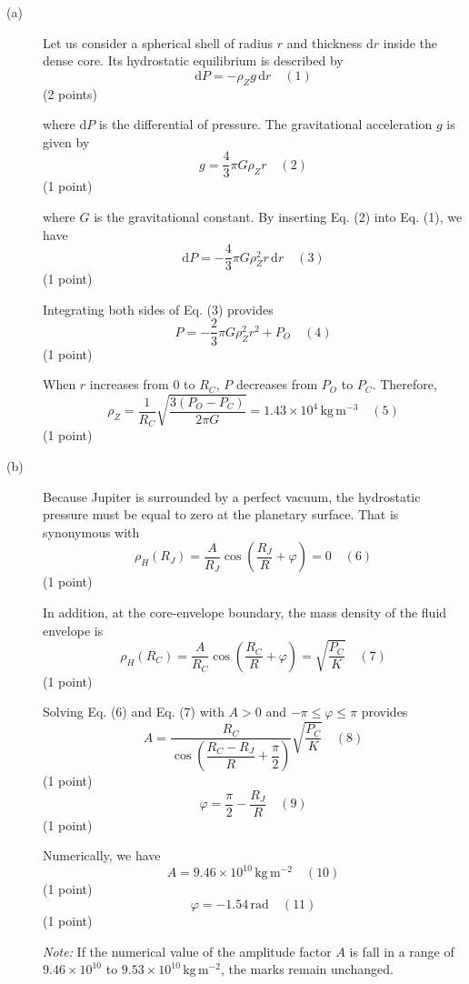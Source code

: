 \begin{description}
\item[(a)] Let us consider a spherical shell of radius $r$ and thickness
  $\mathrm{d}r$ inside the dense core. Its hydrostatic equilibrium is
  described by
  \[ \mathrm{d}P = -\rho_Z g\,\mathrm{d}r \quad (1) \]
  \hfill(2 points)

  where $\mathrm{d}P$ is the differential of pressure. The gravitational
  acceleration $g$ is given by
  \[ g = \frac{4}{3}\pi G \rho_Z r \quad (2) \]
  \hfill(1 point)

  where $G$ is the gravitational constant. By inserting Eq. (2) into Eq. (1),
  we have
  \[ \mathrm{d}P = -\frac{4}{3}\pi G \rho_Z^2 r\,\mathrm{d}r \quad (3) \]
  \hfill(1 point)

  Integrating both sides of Eq. (3) provides
  \[ P = -\frac{2}{3}\pi G \rho_Z^2 r^2 + P_O \quad (4) \]
  \hfill(1 point)

  When $r$ increases from 0 to $R_C$, $P$ decreases from $P_O$ to $P_C$.
  Therefore,
  \[ \rho_Z = \frac{1}{R_C}\sqrt{\frac{3(P_O - P_C)}{2\pi G}}
     = 1.43 \times 10^{4}\,\mathrm{kg\,m^{-3}} \quad (5) \]
  \hfill(1 point)

\item[(b)] Because Jupiter is surrounded by a perfect vacuum, the hydrostatic
  pressure must be equal to zero at the planetary surface. That is synonymous
  with
  \[ \rho_H(R_J) = \frac{A}{R_J}\cos\left(\frac{R_J}{R} + \varphi\right) = 0
     \quad (6) \]
  \hfill(1 point)

  In addition, at the core-envelope boundary, the mass density of the fluid
  envelope is
  \[ \rho_H(R_C) = \frac{A}{R_C}\cos\left(\frac{R_C}{R} + \varphi\right)
     = \sqrt{\frac{P_C}{K}} \quad (7) \]
  \hfill(1 point)

  Solving Eq. (6) and Eq. (7) with $A > 0$ and $-\pi \le \varphi \le \pi$
  provides
  \[ A = \frac{R_C}{\cos\left(\dfrac{R_C - R_J}{R} + \dfrac{\pi}{2}\right)}
     \sqrt{\frac{P_C}{K}} \quad (8) \]
  \hfill(1 point)
  \[ \varphi = \frac{\pi}{2} - \frac{R_J}{R} \quad (9) \]
  \hfill(1 point)

  Numerically, we have
  \[ A = 9.46 \times 10^{10}\,\mathrm{kg\,m^{-2}} \quad (10) \]
  \hfill(1 point)
  \[ \varphi = -1.54\,\mathrm{rad} \quad (11) \]
  \hfill(1 point)

  \textit{Note:} If the numerical value of the amplitude factor $A$ is fall in
  a range of $9.46 \times 10^{10}$ to $9.53 \times 10^{10}\,\mathrm{kg\,m^{-2}}$,
  the marks remain unchanged.


\end{description}
